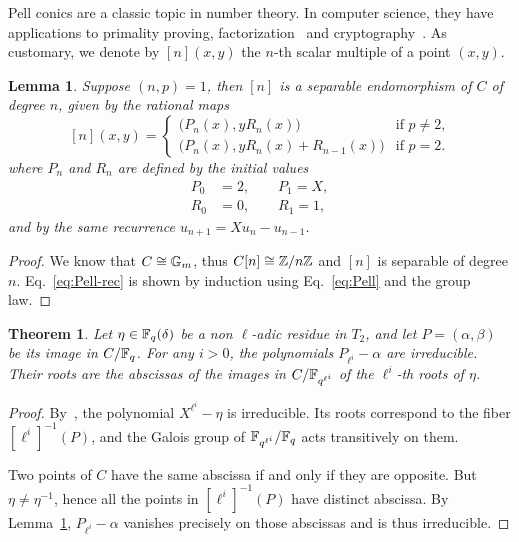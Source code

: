 \documentclass{sig-alternate}
\newtheorem{theorem}[definition]{Theorem}
\newtheorem{lemma}[definition]{Lemma}
\begin{document}
Pell conics are a classic topic in number
theory\cite{lenstra02-pell}. In computer science, they have
applications to primality proving,
factorization~\cite{lemmermeyer03,hambleton12} and
cryptography~\cite{rubin-silverberg+crypto03}. As customary, we denote
by $[n](x,y)$ the $n$-th scalar multiple of a point $(x,y)$.

\begin{lemma}
  \label{th:T2-divpol}
  Suppose $(n,p)=1$, then $[n]$ is a separable endomorphism of $C$ of
  degree $n$, given by the rational maps
  \begin{equation}
    \label{eq:Pell-rec}
    [n](x,y) = 
    \begin{cases}
      \bigr(P_n(x), y R_n(x)\bigl) & \text{if $p\ne2$,}\\
      \bigr(P_n(x), y R_n(x) + R_{n-1}(x)\bigl) & \text{if $p=2$.}      
    \end{cases}
  \end{equation}
  where $P_n$ and $R_n$ are defined by the initial values
  \begin{align*}
    P_0 &= 2,\qquad P_1=X,\\
    R_0 &= 0,\qquad R_1=1,
  \end{align*}
  and by the same recurrence $u_{n+1} = Xu_{n} - u_{n-1}$.
\end{lemma}
\begin{proof}
  We know that $C\cong\mathbb{G}_m$, thus $C[n]\cong\mathbb{Z}/n\mathbb{Z}$ and $[n]$
  is separable of degree $n$. Eq.~\eqref{eq:Pell-rec} is shown by
  induction using Eq.~\eqref{eq:Pell} and the group law.
\end{proof}





\begin{theorem}
  \label{th:T2-irred}
  Let $\eta\in\mathbb{F}_q(\delta)$ be a non $\ell$-adic residue in $T_2$, and
  let $P=(\alpha,\beta)$ be its image in $C/\mathbb{F}_q$. For any $i>0$, the
  polynomials $P_{\ell^i}-\alpha$ are irreducible. Their roots are the
  abscissas of the images in $C/\mathbb{F}_{q^{\ell^i}}$ of the $\ell^i$-th
  roots of $\eta$.
\end{theorem}
\begin{proof}
  By~\cite[Th.~VI.9.1]{lang}, the polynomial $X^{\ell^i}-\eta$ is
  irreducible. Its roots correspond to the fiber $[\ell^i]^{-1}(P)$,
  and the Galois group of $\mathbb{F}_{q^{\ell^i}}/\mathbb{F}_q$ acts transitively on
  them.

  Two points of $C$ have the same abscissa if and only if they are
  opposite. But $\eta\ne\eta^{-1}$, hence all the points in
  $[\ell^i]^{-1}(P)$ have distinct abscissa.  By
  Lemma~\ref{th:T2-divpol}, $P_{\ell^i}-\alpha$ vanishes precisely on
  those abscissas and is thus irreducible.
\end{proof}
\end{document}
